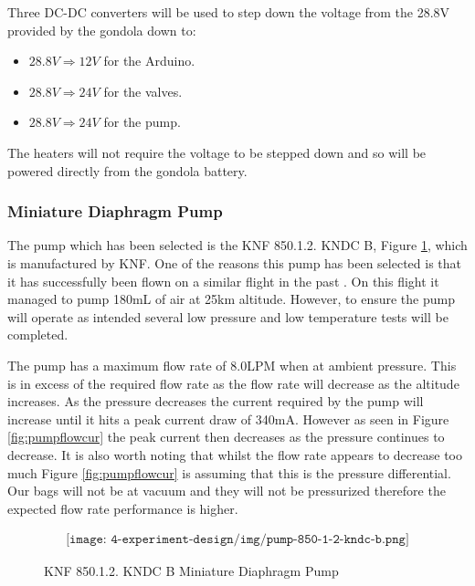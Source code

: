 \begin{centering}
Three DC-DC converters will be used to step down the voltage from the 28.8V provided by the gondola down to: 
\end{centering}

\begin{centering}
\begin{itemize}
  \item $28.8V \Longrightarrow 12V$ for the Arduino.  
  \item $28.8V \Longrightarrow 24V$ for the valves.
  \item $28.8V \Longrightarrow 24V$ for the pump.
  \end{itemize}

\end{centering}
\bigskip

\begin{centering}
The heaters will not require the voltage to be stepped down and so will be powered directly from the gondola battery.
\end{centering}
\bigskip

\subsubsection{Miniature Diaphragm Pump}
The pump which has been selected is the KNF 850.1.2. KNDC B, Figure \ref{fig:pumppic}, which is manufactured by KNF. One of the reasons this pump has been selected is that it has successfully been flown on a similar flight in the past \cite{LISA}. On this flight it managed to pump 180mL of air at 25km altitude. However, to ensure the pump will operate as intended several low pressure and low temperature tests will be completed.

The pump has a maximum flow rate of 8.0LPM when at ambient pressure. This is in excess of the required flow rate as the flow rate will decrease as the altitude increases. As the pressure decreases the current required by the pump will increase until it hits a peak current draw of 340mA. However as seen in Figure \ref{fig:pumpflowcur} the peak current then decreases as the pressure continues to decrease. It is also worth noting that whilst the flow rate appears to decrease too much Figure \ref{fig:pumpflowcur} is assuming that this is the pressure differential. Our bags will not be at vacuum and they will not be pressurized therefore the expected flow rate performance is higher.

\begin{figure}[H]
    \begin{align*}
        \texttt{[image: 4-experiment-design/img/pump-850-1-2-kndc-b.png]}
    \end{align*}
    \caption{KNF 850.1.2. KNDC B Miniature Diaphragm Pump}\label{fig:pumppic}
\end{figure}


